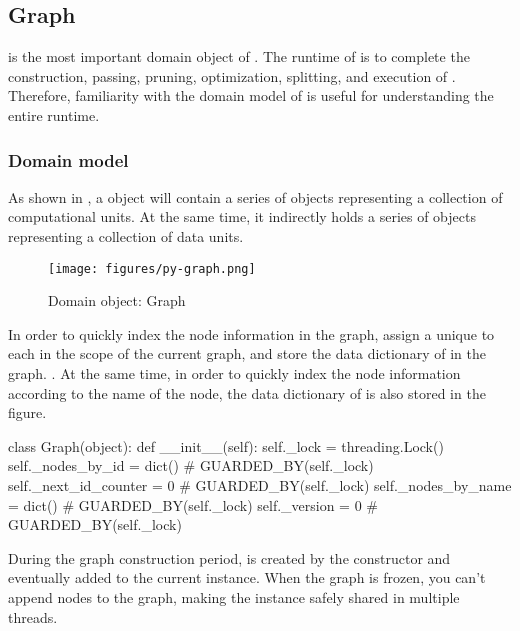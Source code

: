 \begin{content}
\subsection{Graph}
 is the most important domain object of \tf{}. The runtime of \tf{} is to complete the construction, passing, pruning, optimization, splitting, and execution of . Therefore, familiarity with the domain model of  is useful for understanding the entire \tf{} runtime.


\subsubsection{Domain model}
As shown in , a  object will contain a series of  objects representing a collection of computational units. At the same time, it indirectly holds a series of  objects representing a collection of data units.

\begin{figure}[H]
  \centering
  \texttt{[image: figures/py-graph.png]}
  \caption{Domain object: Graph}
  \label{fig:py-graph}
\end{figure}

In order to quickly index the node information in the graph, assign a unique  to each  in the scope of the current graph, and store the data dictionary of  in the graph. . At the same time, in order to quickly index the node information according to the name of the node, the data dictionary of  is also stored in the figure.

\begin{leftbar}
\begin{python}
class Graph(object):
  def __init__(self):
    self._lock = threading.Lock()
    self._nodes_by_id = dict()    # GUARDED\_BY(self.\_lock)
    self._next_id_counter = 0     # GUARDED\_BY(self.\_lock)
    self._nodes_by_name = dict()  # GUARDED\_BY(self.\_lock)
    self._version = 0             # GUARDED\_BY(self.\_lock)
\end{python}
\end{leftbar}

During the graph construction period,  is created by the  constructor and eventually added to the current  instance. When the graph is frozen, you can't append nodes to the graph, making the  instance safely shared in multiple threads.


\end{content}
